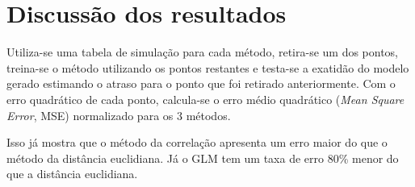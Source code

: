 \section{Discussão dos resultados}
Utiliza-se uma tabela de simulação para cada método, retira-se um dos pontos, treina-se o método utilizando os pontos restantes e testa-se a exatidão do modelo gerado estimando o atraso para o ponto que foi retirado anteriormente.
Com o erro quadrático de cada ponto, calcula-se o erro médio quadrático (\textit{Mean Square Error}, MSE) normalizado para os 3 métodos.

Isso já mostra que o método da correlação apresenta um erro maior do que o método da distância euclidiana. Já o GLM tem um taxa de erro 80\% menor do que a distância euclidiana.
